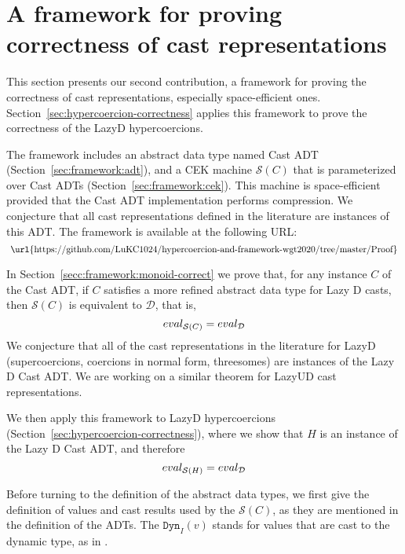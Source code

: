 \documentclass[acmsmall,review,anonymous]{acmart}\settopmatter{printfolios=true,printccs=false,printacmref=false}
\newcommand{\lazyUD}{Lazy\;UD}
\newcommand{\lazyD}{Lazy\;D}
\newcommand{\hcvOOinj}[2]{\mathtt{Dyn}_{#1}(#2)}
\newcommand{\ineffCEKD}{\ensuremath{\mathcal{D}}}
\newcommand{\effCEK}[1]{\ensuremath{\mathcal{S}(#1)}}
\newcommand{\evalEqv}[2]{\ensuremath{eval_{\text{#1}} = eval_{\text{#2}}}}
\newcommand{\urlLazyDProof}{
	\url{https://github.com/LuKC1024/hypercoercion-and-framework-wgt2020/tree/master/Proof}
}
\begin{document}
\section{A framework for proving correctness of cast representations}
\label{sec:framework}

This section presents our second contribution, a framework for proving
the correctness of cast representations, especially space-efficient
ones. Section~\ref{sec:hypercoercion-correctness} applies this
framework to prove the correctness of the \lazyD{} hypercoercions.

The framework includes an abstract data type named Cast ADT 
(Section~\ref{sec:framework:adt}), and a CEK machine \effCEK{C} that is 
parameterized over Cast ADTs (Section~\ref{sec:framework:cek}). This machine is 
space-efficient provided that the Cast ADT implementation performs compression. 
We conjecture that all cast representations defined in the literature
are instances of this ADT. The framework is available at the following URL:
\[\text{\urlLazyDProof}\]


In Section~\ref{secc:framework:monoid-correct} we prove that, for any
instance $C$ of the Cast ADT, if $C$ satisfies a more refined abstract
data type for Lazy D casts, then \effCEK{C} is equivalent to
\ineffCEKD{}, that is,
\[
  \evalEqv{\effCEK{C}}{\ineffCEKD}
\]
We conjecture that all of the cast representations in the literature
for \lazyD{} (supercoercions, coercions in normal form, threesomes)
are instances of the Lazy D Cast ADT.  We are working on a similar
theorem for \lazyUD{} cast representations.

We then apply this framework to \lazyD{} hypercoercions
(Section~\ref{sec:hypercoercion-correctness}), where we show that $H$
is an instance of the Lazy D Cast ADT, and therefore
\[
  \evalEqv{\effCEK{H}}{\ineffCEKD}
\]

Before turning to the definition of the abstract data types, we first
give the definition of values and cast results used by the \effCEK{C}, as they 
are mentioned in the definition of the ADTs. The $\hcvOOinj{I}{v}$ stands for 
values that are cast to the dynamic type, as in \citet{wadler2009well}.
\end{document}
